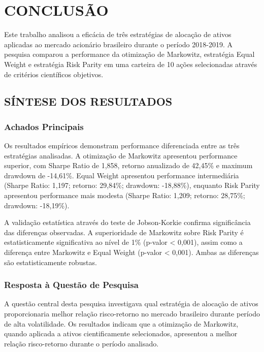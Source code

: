 
\chapter{CONCLUSÃO}

Este trabalho analisou a eficácia de três estratégias de alocação de ativos aplicadas ao mercado acionário brasileiro durante o período 2018-2019. A pesquisa comparou a performance da otimização de Markowitz, estratégia Equal Weight e estratégia Risk Parity em uma carteira de 10 ações selecionadas através de critérios científicos objetivos.

\section{SÍNTESE DOS RESULTADOS}

\subsection{Achados Principais}

Os resultados empíricos demonstram performance diferenciada entre as três estratégias analisadas. A otimização de Markowitz apresentou performance superior, com Sharpe Ratio de 1,858, retorno anualizado de 42,45\% e maximum drawdown de -14,61\%. Equal Weight apresentou performance intermediária (Sharpe Ratio: 1,197; retorno: 29,84\%; drawdown: -18,88\%), enquanto Risk Parity apresentou performance mais modesta (Sharpe Ratio: 1,209; retorno: 28,75\%; drawdown: -18,19\%).

A validação estatística através do teste de Jobson-Korkie confirma significância das diferenças observadas. A superioridade de Markowitz sobre Risk Parity é estatisticamente significativa ao nível de 1\% (p-valor < 0,001), assim como a diferença entre Markowitz e Equal Weight (p-valor < 0,001). Ambas as diferenças são estatisticamente robustas.

\subsection{Resposta à Questão de Pesquisa}

A questão central desta pesquisa investigava qual estratégia de alocação de ativos proporcionaria melhor relação risco-retorno no mercado brasileiro durante período de alta volatilidade. Os resultados indicam que a otimização de Markowitz, quando aplicada a ativos cientificamente selecionados, apresentou a melhor relação risco-retorno durante o período analisado.

